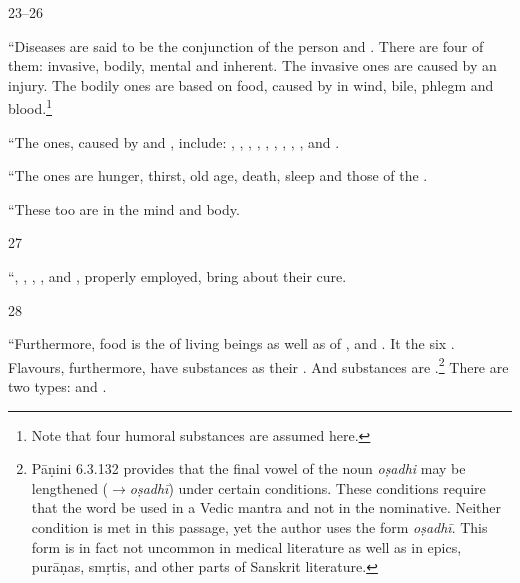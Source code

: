\begin{translation}
    \item[23--26]  

“Diseases are said to be the conjunction of the person and
. There are four of them: invasive, bodily,
mental and inherent.  The invasive ones are caused by an injury.  The
bodily ones are based on food, caused by
 in wind, bile, phlegm and
blood.\footnote{Note that four humoral substances are assumed here.}
    
“The  ones, caused by 
     and 
    , 
    include:  
    , 
    , 
    , 
    , 
    , 
    ,
    ,
    ,
    , 
    and
    .
    
“The  ones are hunger, thirst, old age, death, 
    sleep and  those of the .
    
“These too are  in the mind and body.

\item[27]    

“,
    ,
    ,
    ,
     and
    , 
    properly employed, bring about their cure.
    
    
    \item [28] 
    
“Furthermore, food is the   of living beings as well as
of ,  and . It  the six .
Flavours, furthermore, have substances as their
.  And substances are
.\footnote{Pāṇini 6.3.132 provides that the
    final vowel of the noun \emph{oṣadhi} may be lengthened
    (\emph{$\rightarrow$oṣadhī}) under certain conditions.  These
    conditions require that the word be used in a Vedic mantra and not in
    the nominative.  Neither condition is met in this passage, yet the
    author uses the form \emph{oṣadhī}. This form is in fact not uncommon
    in medical literature as well as in epics, purāṇas, smṛtis, and other
    parts of Sanskrit literature.} There are two types:
     and .
    

\end{translation}
